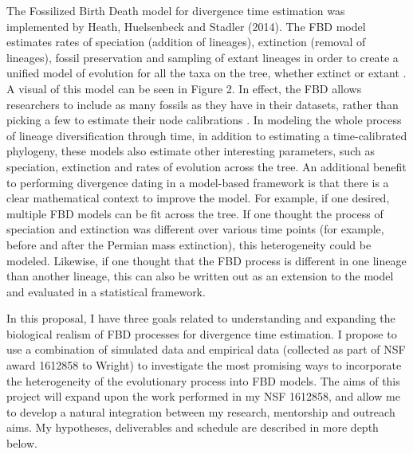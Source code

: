 \documentclass[12pt]{article}
\begin{document}
The Fossilized Birth Death model for divergence time estimation was implemented by Heath, Huelsenbeck and Stadler (2014).
The FBD model estimates rates of speciation (addition of lineages), extinction (removal of lineages), fossil preservation and sampling of extant lineages in order to create a unified model of evolution for all the taxa on the tree, whether extinct or extant \cite{stadler2010}.
A visual of this model can be seen in Figure 2.
In effect, the FBD allows researchers to include as many fossils as they have in their datasets, rather than picking a few to estimate their node calibrations \cite{Gavryushkina2016, zhang2016}.
In modeling the whole process of lineage diversification through time, in addition to estimating a time-calibrated phylogeny, these models also estimate other interesting parameters, such as speciation, extinction and rates of evolution across the tree. 
An additional benefit to performing divergence dating in a model-based framework is that there is a clear mathematical context to improve the model.
For example, if one desired, multiple FBD models can be fit across the tree.
If one thought the process of speciation and extinction was different over various time points (for example, before and after the Permian mass extinction), this heterogeneity could be modeled.
Likewise, if one thought that the FBD process is different in one lineage than another lineage, this can also be written out as an extension to the model and evaluated in a statistical framework.\par
In this proposal, I have three goals related to understanding and expanding the biological realism of FBD processes for divergence time estimation. 
I propose to use a combination of simulated data and empirical data (collected as part of NSF award 1612858 to Wright) to investigate the most promising ways to incorporate the heterogeneity of the evolutionary process into FBD models.
The aims of this project will expand upon the work performed in my NSF 1612858, and allow me to develop a natural integration between my research, mentorship and outreach aims.
My hypotheses, deliverables and schedule are described in more depth below.
 \par
 
\end{document}
